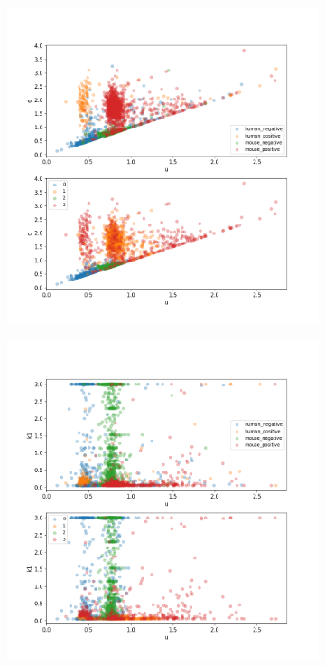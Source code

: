 \begin{figure}
\begin{subfigure}{0.3\textwidth}
	\end{subfigure}
	\hfill
	\begin{subfigure}{0.3\textwidth}
		\includegraphics[width=\textwidth]{fig/seperate_u_d}
	\end{subfigure}
	\hfill
	\begin{subfigure}{0.3\textwidth}
		\includegraphics[width=\textwidth]{fig/seperate_u_k1}

\end{subfigure}
\end{figure}
